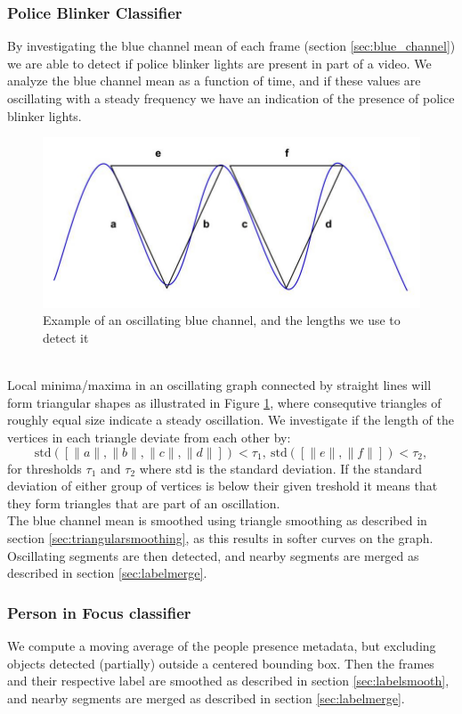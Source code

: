 \subsubsection{Police Blinker Classifier}\label{sec:police_detection}
%
By investigating the blue channel mean of each frame (section \ref{sec:blue_channel}) we are able to detect if police blinker lights are present in part of a video.
We analyze the blue channel mean as a function of time, and if these values are oscillating with a steady frequency we have an indication of the presence of police blinker lights.
%
\begin{figure}[!ht]
     \centering
     \includegraphics[width=1.05\textwidth]{img/triangles.jpg}
     \caption{Example of an oscillating blue channel, and the lengths we use to detect it}\label{fig:triangles}
\end{figure}\\
%
Local minima/maxima in an oscillating graph connected by straight lines will form triangular shapes as illustrated in Figure \ref{fig:triangles}, where consequtive triangles of roughly equal size indicate a steady oscillation. We investigate if the length of the vertices in each triangle deviate from each other by:
%
\[
\text{std}([\|a\|,\|b\|,\|c\|,\|d\|]) < \tau_1,~\text{std}([\|e\|,\|f\|]) < \tau_2,
\]
%
for thresholds $\tau_1$ and $\tau_2$ where std is the standard deviation. If the standard deviation of either group of vertices is below their given treshold it means that they form triangles that are part of an oscillation.\\
The blue channel mean is smoothed using triangle smoothing as described in section \ref{sec:triangularsmoothing}, as this results in softer curves on the graph. Oscillating segments are then detected, and nearby segments are merged as described in section \ref{sec:labelmerge}.
%
\subsubsection{Person in Focus classifier}\label{sec:infocus}
%
We compute a moving average of the people presence metadata, but excluding objects detected (partially) outside a centered bounding box. Then the frames and their respective label are smoothed as described in section \ref{sec:labelsmooth}, and nearby segments are merged as described in section \ref{sec:labelmerge}. 
%

